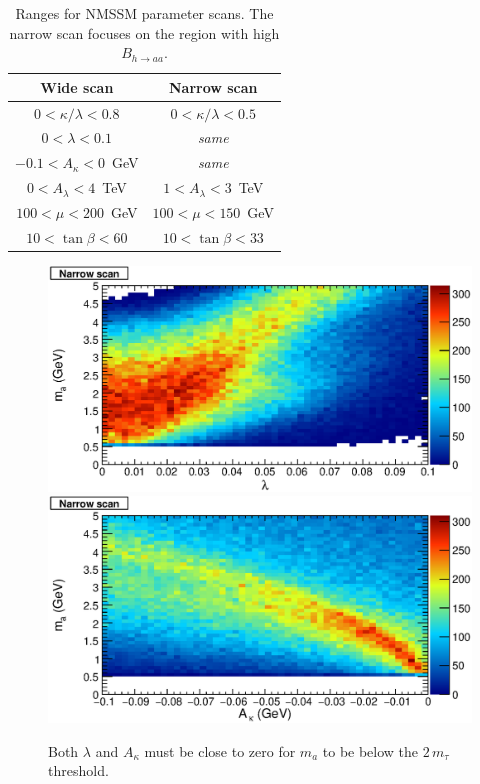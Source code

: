 \documentclass[aps,12pt,superscriptaddress,nofootinbib,floatfix,showpacs]{revtex4}
\begin{document}
\begin{table}[htb]
\caption{Ranges for NMSSM parameter scans.  The narrow scan focuses on
the region with high $B_{h \to aa}$. \label{brhaa_table}}
\begin{center}
\renewcommand{\arraystretch}{1.2}
\begin{tabular}{| c c |}
\hline \mbox{\hspace{1.25 cm}}Wide scan\mbox{\hspace{1.25 cm}} & \mbox{\hspace{1.25 cm}}Narrow scan\mbox{\hspace{1.25 cm}} \\\hline
$0 < \kappa/\lambda < 0.8$ & $0 < \kappa/\lambda < 0.5$ \\
$0 < \lambda < 0.1$ & {\it same} \\
$-0.1 < A_\kappa < 0$~GeV & {\it same} \\
$0 < A_\lambda < 4$~TeV & $1 < A_\lambda < 3$~TeV \\
$100 < \mu < 200$~GeV & $100 < \mu < 150$~GeV \\
$10 < \tan\beta < 60$ & $10 < \tan\beta < 33$ \\\hline
\end{tabular}
\end{center}
\end{table}

\begin{figure}[htb]
\begin{center}
\includegraphics[width=0.5\linewidth]{plots/pmass1_lambda.eps}%
\includegraphics[width=0.5\linewidth]{plots/pmass1_Akappa.eps}

\caption{Both $\lambda$ and $A_\kappa$ must be close to zero for $m_a$
  to be below the $2 \, m_\tau$ threshold. \label{pmass1_Akappa}}
\end{center}
\end{figure}
\end{document}
